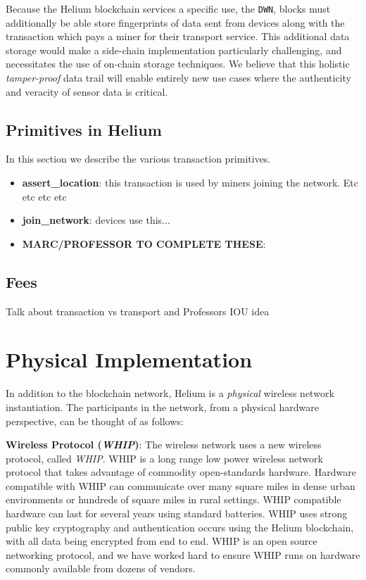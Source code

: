 \documentclass[letterpaper,11pt]{article}
\begin{document}
Because the Helium blockchain services a specific use, the \verb|DWN|, blocks must additionally be able store fingerprints of data sent from devices along with the transaction which pays a miner for their transport service. This additional data storage would make a side-chain implementation particularly challenging, and necessitates the use of on-chain storage techniques. We believe that this holistic \textit{tamper-proof} data trail will enable entirely new use cases where the authenticity and veracity of sensor data is critical.

\subsection{Primitives in Helium}

In this section we describe the various transaction primitives.

\begin{itemize}
  \item \textbf{assert\_location}: this transaction is used by miners joining the network. Etc etc etc etc
  \item \textbf{join\_network}: devices use this...
  \item \textbf{MARC/PROFESSOR TO COMPLETE THESE}:
\end{itemize}

\subsection{Fees}

Talk about transaction vs transport and Professors IOU idea

\newpage

\section{Physical Implementation}

In addition to the blockchain network, Helium is a \textit{physical} wireless network instantiation. The participants in the network, from a physical hardware perspective, can be thought of as follows:\newline

\textbf{Wireless Protocol (\textit{WHIP})}: The wireless network uses a new wireless protocol, called \textit{WHIP}. WHIP is a long range low power wireless network protocol that takes advantage of commodity open-standards hardware. Hardware compatible with WHIP can communicate over many square miles in dense urban environments or hundreds of square miles in rural settings. WHIP compatible hardware can last for several years using standard batteries. WHIP uses strong public key cryptography and authentication occurs using the Helium blockchain, with all data being encrypted from end to end. WHIP is an open source networking protocol, and we have worked hard to ensure WHIP runs on hardware commonly available from dozens of vendors.\newline
\end{document}
